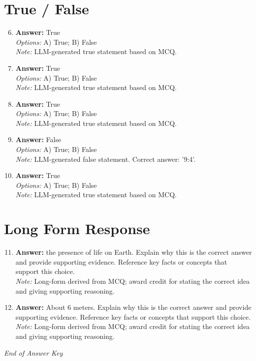 \documentclass[12pt]{article}
\begin{document}
\section*{True / False}
\begin{enumerate}[label=\arabic*.]
\setcounter{enumi}{5}
\item \textbf{Answer:} True
\\ \textit{Options:} A) True; B) False
\\ \textit{Note:} LLM-generated true statement based on MCQ.
\item \textbf{Answer:} True
\\ \textit{Options:} A) True; B) False
\\ \textit{Note:} LLM-generated true statement based on MCQ.
\item \textbf{Answer:} True
\\ \textit{Options:} A) True; B) False
\\ \textit{Note:} LLM-generated true statement based on MCQ.
\item \textbf{Answer:} False
\\ \textit{Options:} A) True; B) False
\\ \textit{Note:} LLM-generated false statement. Correct answer: '9:4'.
\item \textbf{Answer:} True
\\ \textit{Options:} A) True; B) False
\\ \textit{Note:} LLM-generated true statement based on MCQ.
\end{enumerate}

\section*{Long Form Response}
\begin{enumerate}[label=\arabic*.]
\setcounter{enumi}{10}
\item \textbf{Answer:} the presence of life on Earth. Explain why this is the correct answer and provide supporting evidence. Reference key facts or concepts that support this choice.
\\ \textit{Note:} Long-form derived from MCQ; award credit for stating the correct idea and giving supporting reasoning.
\item \textbf{Answer:} About 6 meters. Explain why this is the correct answer and provide supporting evidence. Reference key facts or concepts that support this choice.
\\ \textit{Note:} Long-form derived from MCQ; award credit for stating the correct idea and giving supporting reasoning.
\end{enumerate}

\vfill
\noindent\textit{End of Answer Key}
\end{document}
